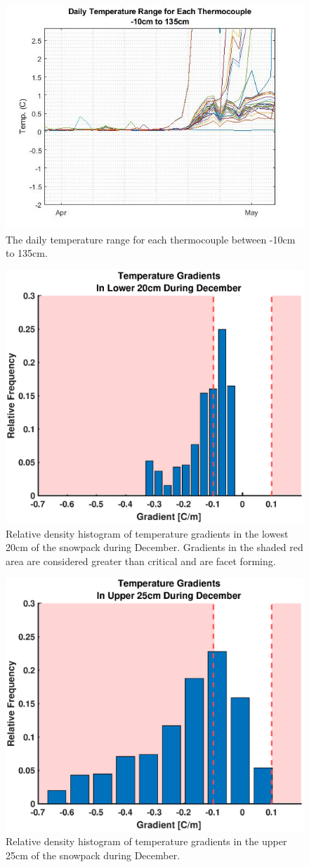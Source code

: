  \begin{figure}[H]
    \centering
    \includegraphics[width=0.5\linewidth]{figures/DailyTempRange_Isotherm.jpg}
    \caption{The daily temperature range for each thermocouple between -10cm to 135cm.}
    \label{fig:DailyTempRange}
 \end{figure}
 
  \begin{figure}[H]
    \centering
    \includegraphics[width=0.5\linewidth]{figures/TempGrad/Dec_L20_RDH.eps}
    \caption{Relative density histogram of temperature gradients in the lowest 20cm of the snowpack during December. Gradients in the shaded red area are considered greater than critical and are facet forming.}
    \label{fig:Dec_L20_RDH}
 \end{figure}
 
  \begin{figure}[H]
    \centering
    \includegraphics[width=0.5\linewidth]{figures/TempGrad/Dec_U25_RDH.eps}
    \caption{Relative density histogram of temperature gradients in the upper 25cm of the snowpack during December.}
    \label{fig:Dec_U25_RDH}
 \end{figure}


